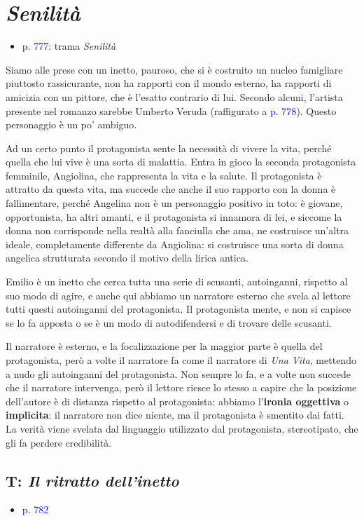 \documentclass[a4paper, twoside, titlepage]{book}
\newcommand{\elenco}[1]{%
\begin{itemize}
#1
\end{itemize}}
\renewcommand{\emph}[1]{\textcolor{blue}{#1}}
\begin{document}
\chapter{\textit{Senilità}}
\elenco{\item \emph{p. 777}: trama \textit{Senilità}}

Siamo alle prese con un inetto, pauroso, che si è costruito un nucleo famigliare piuttosto rassicurante, non ha rapporti con il mondo esterno, ha rapporti di amicizia con un pittore, che è l'esatto contrario di lui. Secondo alcuni, l'artista presente nel romanzo sarebbe Umberto Veruda (raffigurato a \emph{p. 778}). Questo personaggio è un po' ambiguo.

Ad un certo punto il protagonista sente la necessità di vivere la vita, perché quella che lui vive è una sorta di malattia.
Entra in gioco la seconda protagonista femminile, Angiolina, che rappresenta la vita e la salute.
Il protagonista è attratto da questa vita, ma succede che anche il suo rapporto con la donna è fallimentare, perché Angelina non è un personaggio positivo in toto: è giovane, opportunista, ha altri amanti, e il protagonista si innamora di lei, e siccome la donna non corrisponde nella realtà alla fanciulla che ama, ne costruisce un'altra ideale, completamente differente da Angiolina: si costruisce una sorta di donna angelica strutturata secondo il motivo della lirica antica.

Emilio è un inetto che cerca tutta una serie di scusanti, autoinganni, rispetto al suo modo di agire, e anche qui abbiamo un narratore esterno che svela al lettore tutti questi autoinganni del protagonista. Il protagonista mente, e non si capisce se lo fa apposta o se è un modo di autodifendersi e di trovare delle scusanti.

Il narratore è esterno, e la focalizzazione per la maggior parte è quella del protagonista, però a volte il narratore fa come il narratore di \textit{Una Vita}, mettendo a nudo gli autoinganni del protagonista. Non sempre lo fa, e a volte non succede che il narratore intervenga, però il lettore riesce lo stesso a capire che la posizione dell'autore è di distanza rispetto al protagonista: abbiamo l'\textbf{ironia oggettiva} o \textbf{implicita}: il narratore non dice niente, ma il protagonista è smentito dai fatti.
La verità viene svelata dal linguaggio utilizzato dal protagonista, stereotipato, che gli fa perdere credibilità.
\newpage

\section{T: \textit{Il ritratto dell'inetto}}
\elenco{\item \emph{p. 782}}
\end{document}
